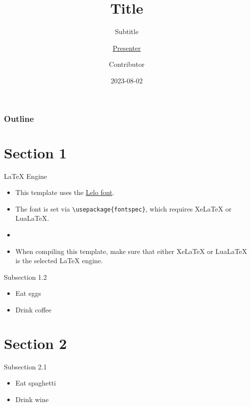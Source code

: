 \documentclass[10pt,aspectratio = 169,]{beamer}
\title{Title}
\subtitle{Subtitle}
\author{ \texorpdfstring{\underline{Presenter}}{\underline{Presenter}}  \and  \texorpdfstring{Contributor}{Contributor} }
\date{2023-08-02}
\institute{Institute}
\providecommand{\tightlist}{\setlength{\itemsep}{0pt}\setlength{\parskip}{0pt}}
\begin{document}
\begin{frame}[plain]{}
  \titlepage
\end{frame}

\begin{frame}
  \frametitle{Outline}
  \tableofcontents
\end{frame}

\hypertarget{section-1}{%
\section{Section 1}\label{section-1}}

\begin{frame}[fragile]{LaTeX Engine}
\protect\hypertarget{latex-engine}{}
\begin{itemize}
\tightlist
\item
  This template uses the \href{https://camelot-typefaces.com/lelo}{Lelo
  font}.
\item
  The font is set via \texttt{\textbackslash{}usepackage\{fontspec\}},
  which requires XeLaTeX or LuaLaTeX.
\item
\item
  When compiling this template, make sure that either XeLaTeX or
  LuaLaTeX is the selected LaTeX engine.
\end{itemize}
\end{frame}

\begin{frame}{Subsection 1.2}
\protect\hypertarget{subsection-1.2}{}
\begin{itemize}
\tightlist
\item
  Eat eggs
\item
  Drink coffee
\end{itemize}
\end{frame}

\hypertarget{section-2}{%
\section{Section 2}\label{section-2}}

\begin{frame}{Subsection 2.1}
\protect\hypertarget{subsection-2.1}{}
\begin{itemize}
\tightlist
\item
  Eat spaghetti
\item
  Drink wine
\end{itemize}
\end{frame}
\end{document}
